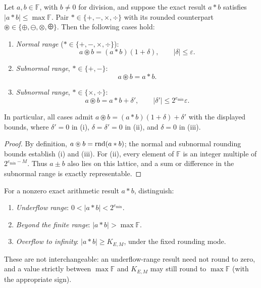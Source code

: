 \begin{theorem}
Let $a, b\in\mathbb F$, with $b\ne0$ for division, and suppose
the exact result $a*b$ satisfies $|a*b|\le\max\mathbb F$.
Pair $*\in\{+, -, \times, \div\}$ with its rounded counterpart
$\circledast\in\{\oplus, \ominus, \otimes, \odiv\}$.
Then the following cases hold:
\begin{enumerate}[label=(\roman*)]
 \item \emph{Normal range} ($*\in\{+, -, \times, \div\}$):
 \[
 a\circledast b=(a*b)(1+\delta), \qquad|\delta|\le\varepsilon.
 \]
 \item \emph{Subnormal range}, $*\in\{+, -\}$:
 \[
 a\circledast b=a*b.
 \]
 \item \emph{Subnormal range}, $*\in\{\times, \div\}$:
 \[
 a\circledast b=a*b+\delta',
 \qquad|\delta'|\le2^{e_{\min}}\varepsilon.
 \]
\end{enumerate}
In particular, all cases admit
$a\circledast b=(a*b)(1+\delta)+\delta'$ with the displayed bounds,
where $\delta'=0$ in (i), $\delta=\delta'=0$ in (ii), and
$\delta=0$ in (iii).
\end{theorem}
\begin{proof}
By definition, $a\circledast b=\operatorname{rnd}(a*b)$; the normal
and subnormal rounding bounds establish (i) and (iii).
For (ii), every element of $\mathbb F$ is an integer
multiple of $2^{e_{\min}-M}$. Thus $a\pm b$ also lies on
this lattice, and a sum or difference in the subnormal
range is exactly representable.
\end{proof}

\begin{definition}
For a nonzero exact arithmetic result $a*b$, distinguish:
\begin{enumerate}[label=(\roman*)]
 \item \emph{Underflow range}: $0<|a*b|<2^{e_{\min}}$.
 \item \emph{Beyond the finite range}:
 $|a*b|>\max\mathbb F$.
 \item \emph{Overflow to infinity}:
 $|a*b|\ge K_{E, M}$, under the fixed rounding mode.
\end{enumerate}
These are not interchangeable: an underflow-range result
need not round to zero, and a value strictly between
$\max\mathbb F$ and $K_{E, M}$ may still round to
$\max\mathbb F$ (with the appropriate sign).
\end{definition}

